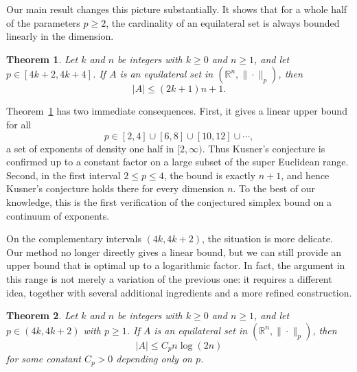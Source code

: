 \documentclass[11pt]{article}
\newtheorem{theorem}{Theorem}[section]
\theoremstyle{definition}
\begin{document}
Our main result changes this picture substantially. 
It shows that for a whole half of the parameters $p\ge 2$, the cardinality of an equilateral set is always bounded linearly in the dimension. 
\begin{theorem}\label{thm:KusnerConj}
Let $k$ and $n$ be integers with $k\ge 0$ and $n\ge 1$, and let $p\in[4k+2,4k+4]$.
If $A$ is an equilateral set in $(\mathbb R^n,\|\cdot\|_p)$, then
\[
|A|\le (2k+1)n+1.
\]
\end{theorem}
Theorem~\ref{thm:KusnerConj} has two immediate consequences. First, it gives a
linear upper bound for all
\[
p\in [2,4]\cup[6,8]\cup[10,12]\cup\cdots,
\]
a set of exponents of density one half in \([2,\infty)\). Thus Kusner's
conjecture is confirmed up to a constant factor on a large subset of the
super Euclidean range. Second, in the first interval \(2\le p\le4\), the bound is
exactly \(n+1\), and hence Kusner's conjecture holds there for every dimension
\(n\). To the best of our knowledge, this is the first verification of the
conjectured simplex bound on a continuum of exponents.


On the complementary intervals \((4k,4k+2)\), the situation is more delicate. Our method no longer directly gives a linear bound, but we can still provide an upper bound that is optimal up to a logarithmic factor. In fact, the argument in this range is not merely a variation of the previous one: it requires a  different idea, together with several additional ingredients and a more refined construction.
\begin{theorem}\label{thm:log-upper-4k-4k+2}
Let $k$ and $n$ be integers with $k\ge 0$ and $n\ge 1$, and let $p\in(4k,4k+2)$ with $p\ge 1$. If
$A$ is an equilateral set in $(\mathbb R^n,\|\cdot\|_p)$, then
\[
|A|\le C_{p}n\log{(2n)}
\]
for some constant $C_{p}>0$ depending only on $p$.
\end{theorem}
\end{document}
